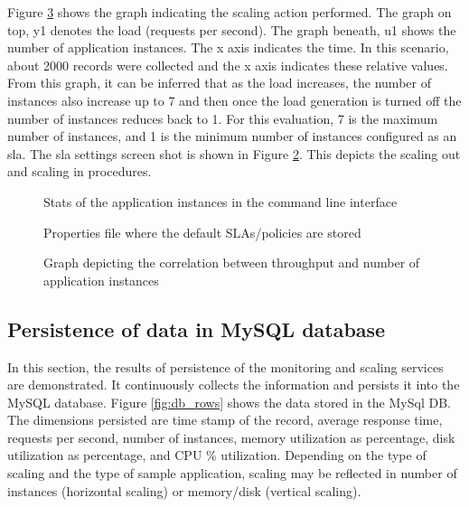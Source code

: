\documentclass[article,type=msc,colorback,12pt,accentcolor=tud8b,table]{tudthesis}
\begin{document}
	Figure \ref{fig:responsetTime_Instances} shows the graph indicating the scaling action performed. The graph on top, y1 denotes the load (requests per second). The graph beneath, u1 shows the number of application instances. The x axis indicates the time. In this scenario, about 2000 records were collected and the x axis indicates these relative values. From this graph, it can be inferred that as the load increases, the number of instances also increase up to 7 and then once the load generation is turned off the number of instances reduces back to 1. For this evaluation, 7 is the maximum number of instances, and 1 is the minimum number of instances configured as an \gls{sla}. The \gls{sla} settings screen shot is shown in Figure \ref{fig:autoscaler_sla_policies}. This depicts the scaling out and scaling in procedures. 
	
	  \begin{figure}[H]
	  	\begin{center}
	  		\makebox[\textwidth]{\texttt{[image: E4]}}
	  	\end{center}
	  	\caption{Stats of the application instances in the command line interface}
	  	\label{fig:cf_cli}
	  \end{figure}

  	  \begin{figure}[H]
  		  	  	\begin{center}
  		  	  	\end{center}
  		  	  	\caption{Properties file where the default SLAs/policies are stored}
  		  	  	\label{fig:autoscaler_sla_policies}
  	  \end{figure}
	  
	  	  \begin{figure}[H]
	  	  	\begin{center}
	  	  		\makebox[\textwidth]{\texttt{[image: E5]}}
	  	  	\end{center}
	  	  	\caption{Graph depicting the correlation between throughput and number of application instances}
	  	  	\label{fig:responsetTime_Instances}
	  	  \end{figure}
	
	\subsection{Persistence of data in MySQL database}
		In this section, the results of persistence of the monitoring and scaling services are demonstrated. It continuously collects the information and persists it into the MySQL database.  Figure \ref{fig:db_rows} shows the data stored in the MySql DB. The dimensions persisted are time stamp of the record, average response time, requests per second, number of instances, memory utilization as percentage, disk utilization as percentage, and CPU \% utilization. Depending on the type of scaling and the type of sample application, scaling may be reflected in number of instances (horizontal scaling) or memory/disk (vertical scaling). 
		
\end{document}
